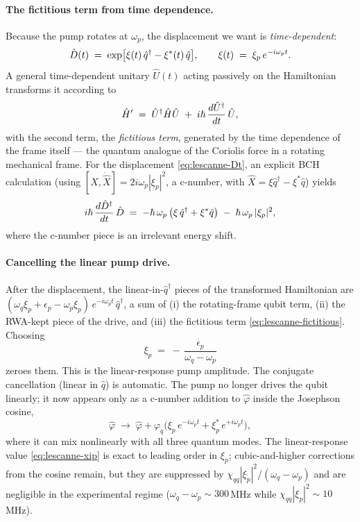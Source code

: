 \paragraph{The fictitious term from time dependence.}
Because the pump rotates at $\omega_p$, the displacement we want is
\emph{time-dependent}:
\begin{equation}
\label{eq:lescanne-Dt}
\hat{D}(t) \;=\; \exp\bigl[\xi(t)\,\hat q^\dagger - \xi^*(t)\,\hat q\bigr],
\qquad \xi(t)\;=\;\xi_p\,e^{-i\omega_p t}.
\end{equation}
A general time-dependent unitary $\hat U(t)$ acting passively on the
Hamiltonian transforms it according to
\begin{equation}
\label{eq:time-dep-frame}
\hat{H}' \;=\; \hat U^\dagger\hat{H}\hat U
\;+\; i\hbar\,\frac{d\hat U^\dagger}{dt}\,\hat U,
\end{equation}
with the second term, the \emph{fictitious term}, generated by the
time dependence of the frame itself --- the quantum analogue of the
Coriolis force in a rotating mechanical frame. For the displacement
\cref{eq:lescanne-Dt}, an explicit BCH calculation (using
$[\hat X,\dot{\hat X}]=2i\omega_p|\xi_p|^2$, a c-number, with
$\hat X=\xi\hat q^\dagger-\xi^*\hat q$) yields
\begin{equation}
\label{eq:lescanne-fictitious}
i\hbar\,\frac{d\hat{D}^\dagger}{dt}\,\hat{D}
\;=\; -\hbar\,\omega_p\,\bigl(\xi\,\hat q^\dagger + \xi^*\hat q\bigr)
\;-\; \hbar\,\omega_p\,|\xi_p|^2,
\end{equation}
where the c-number piece is an irrelevant energy shift.

\paragraph{Cancelling the linear pump drive.}
After the displacement, the linear-in-$\hat q^\dagger$ pieces of the
transformed Hamiltonian are
$(\omega_q\xi_p + \epsilon_p - \omega_p\xi_p)\,e^{-i\omega_p t}\,\hat q^\dagger$,
a sum of (i) the rotating-frame qubit term, (ii) the RWA-kept piece of
the drive, and (iii) the fictitious term \cref{eq:lescanne-fictitious}.
Choosing
\begin{equation}
\label{eq:lescanne-xip}
\boxed{\;\xi_p \;=\; -\,\frac{\epsilon_p}{\omega_q-\omega_p}\;}
\end{equation}
zeroes them. This is the linear-response pump amplitude. The
conjugate cancellation (linear in $\hat q$) is automatic. The pump
no longer drives the qubit linearly; it now appears only as a
c-number addition to $\hat\varphi$ inside the Josephson cosine,
\begin{equation}
\hat\varphi \;\to\; \hat\varphi + \varphi_q\bigl(\xi_p\,e^{-i\omega_p t}+\xi_p^*\,e^{+i\omega_p t}\bigr),
\end{equation}
where it can mix nonlinearly with all three quantum modes. The
linear-response value \cref{eq:lescanne-xip} is exact to leading
order in $\xi_p$; cubic-and-higher corrections from the cosine
remain, but they are suppressed by $\chi_{qq}|\xi_p|^2/(\omega_q-\omega_p)$
and are negligible in the experimental regime
($\omega_q-\omega_p\sim 300$\,MHz while $\chi_{qq}|\xi_p|^2\sim 10$\,MHz).


